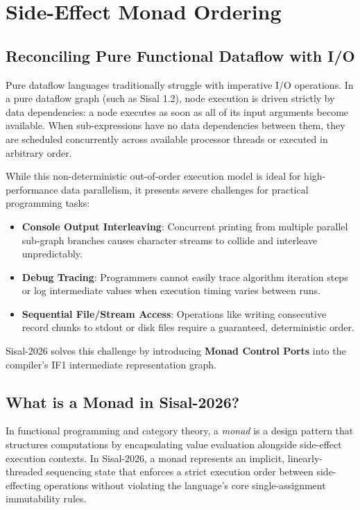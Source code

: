 \chapter{Side-Effect Monad Ordering}
\label{chap:side_effects_monads}

\section{Reconciling Pure Functional Dataflow with I/O}
Pure dataflow languages traditionally struggle with imperative I/O operations. In a pure dataflow graph (such as Sisal 1.2), node execution is driven strictly by data dependencies: a node executes as soon as all of its input arguments become available. When sub-expressions have no data dependencies between them, they are scheduled concurrently across available processor threads or executed in arbitrary order.

While this non-deterministic out-of-order execution model is ideal for high-performance data parallelism, it presents severe challenges for practical programming tasks:
\begin{itemize}
    \item \textbf{Console Output Interleaving}: Concurrent printing from multiple parallel sub-graph branches causes character streams to collide and interleave unpredictably.
    \item \textbf{Debug Tracing}: Programmers cannot easily trace algorithm iteration steps or log intermediate values when execution timing varies between runs.
    \item \textbf{Sequential File/Stream Access}: Operations like writing consecutive record chunks to stdout or disk files require a guaranteed, deterministic order.
\end{itemize}

Sisal-2026 solves this challenge by introducing \textbf{Monad Control Ports} into the compiler's IF1 intermediate representation graph.

\section{What is a Monad in Sisal-2026?}
In functional programming and category theory, a \emph{monad} is a design pattern that structures computations by encapsulating value evaluation alongside side-effect execution contexts. In Sisal-2026, a monad represents an implicit, linearly-threaded sequencing state that enforces a strict execution order between side-effecting operations without violating the language's core single-assignment immutability rules.

